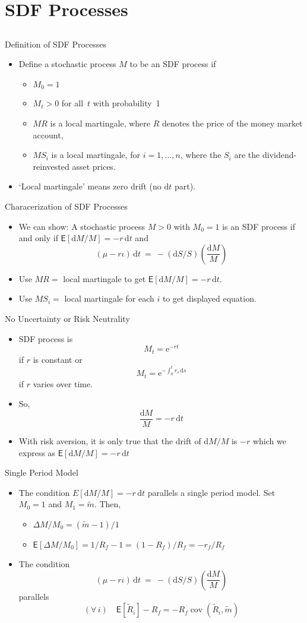 \documentclass[10pt]{beamer}
\DeclareMathOperator{\cov}{cov}
\newcommand{\bi}{\begin{itemize}}
\newcommand{\ei}{\end{itemize}}
\newcommand{\im}{\item}
\newcommand{\D}{\mathrm{d}}
\newcommand{\E}{\mathrm{e}}
\newcommand{\mye}{\ensuremath{\mathsf{E}}}
\newcommand{\tm}{\tilde{m}}
\newcommand{\tr}{\widetilde{R}}
\begin{document}
\section{SDF Processes}
\subsection{}

\begin{frame}{Definition of SDF Processes}
\bi 
\im Define a stochastic process $M$ to be an SDF process if 
\bi
\im $M_0=1$
\im $M_t>0$ for all~$t$ with probability~1
\im $MR$ is a local martingale, where $R$ denotes the price of the money market account,
\im $MS_i$ is a local martingale, for $i=1,\ldots,n$, where the $S_i$ are the dividend-reinvested asset prices.
\ei
\im `Local martingale' means zero drift (no $\D t$ part).  
\ei
\end{frame}

\begin{frame}{Characerization of SDF Processes}
 \bi 
 \im We can show:
A stochastic process $M>0$ with $M_0=1$ is an SDF process if and only if 
$\mye [\D M/M] = - r\,\D t$ and 
 $$ (\mu-r\iota)\,\D t \ = \ -(\D S/S)\left(\frac{\D M}{M} \right)$$
 \im Use $MR=$ local martingale to get $\mye [\D M/M] = - r\,\D t$.
 \im Use $MS_i=$ local martingale for each $i$ to get displayed equation.
 \ei
 \end{frame}

 \begin{frame}{No Uncertainty or Risk Neutrality}
    \bi 
    \im SDF process is 
    $$M_t = \E^{-rt}$$
    if $r$ is constant or
    $$M_t = \E^{-\int_0^t r_s\,\D s}$$
    if $r$ varies over time.
    \im So,
    $$\frac{\D M}{M} = - r\,\D t$$
    \im With risk aversion, it is only true that the drift of $\D M/M$ is $-r$ which we express as $\mye[\D M/M] = - r\,\D t$
    \ei
 \end{frame}

 \begin{frame}{Single Period Model}
    \bi 
    \im The condition $E[\D M/M] = - r\,\D t$ parallels a single period model.  Set $M_0=1$ and $M_1 = \tm$.  Then, 
    \bi
    \im $\Delta M / M_0 = (\tm - 1) / 1$
    \im $\mye[\Delta M/M_0] = 1/R_f - 1 = (1-R_f)/R_f = - r_f/R_f$
    \ei
    \im The condition 
    $$ (\mu-r\iota)\,\D t \ = \ -(\D S/S)\left(\frac{\D M}{M} \right)$$
    parallels
    $$(\forall \, i) \quad \mye[\tr_i] - R_f = - R_f \cov(\tr_i, \tm)$$
\ei
 \end{frame}
\end{document}
